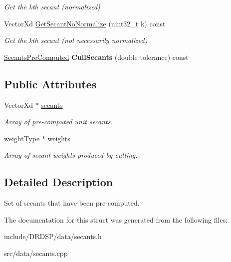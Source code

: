 \begin{DoxyCompactItemize}
\begin{DoxyCompactList}\small\item\em Get the kth secant (normalized) \end{DoxyCompactList}\item 
\hypertarget{struct_d_r_d_s_p_1_1_secants_pre_computed_aedd413333624ec2b3da2a70262b65481}{Vector\-Xd \hyperlink{struct_d_r_d_s_p_1_1_secants_pre_computed_aedd413333624ec2b3da2a70262b65481}{Get\-Secant\-No\-Normalize} (uint32\-\_\-t k) const }\label{struct_d_r_d_s_p_1_1_secants_pre_computed_aedd413333624ec2b3da2a70262b65481}

\begin{DoxyCompactList}\small\item\em Get the kth secant (not necessarily normalized) \end{DoxyCompactList}\item 
\hypertarget{struct_d_r_d_s_p_1_1_secants_pre_computed_a8dcdb9edcefeee50e17d6ab3b792f5e6}{\hyperlink{struct_d_r_d_s_p_1_1_secants_pre_computed}{Secants\-Pre\-Computed} {\bfseries Cull\-Secants} (double tolerance) const }\label{struct_d_r_d_s_p_1_1_secants_pre_computed_a8dcdb9edcefeee50e17d6ab3b792f5e6}

\end{DoxyCompactItemize}
\subsection*{Public Attributes}
\begin{DoxyCompactItemize}
\item 
\hypertarget{struct_d_r_d_s_p_1_1_secants_pre_computed_a15231ffddb89ae1eb2c83cbdc463905a}{Vector\-Xd $\ast$ \hyperlink{struct_d_r_d_s_p_1_1_secants_pre_computed_a15231ffddb89ae1eb2c83cbdc463905a}{secants}}\label{struct_d_r_d_s_p_1_1_secants_pre_computed_a15231ffddb89ae1eb2c83cbdc463905a}

\begin{DoxyCompactList}\small\item\em Array of pre-\/computed unit secants. \end{DoxyCompactList}\item 
\hypertarget{struct_d_r_d_s_p_1_1_secants_pre_computed_a4bb39354f325540fefe37eb7c3f59ad1}{weight\-Type $\ast$ \hyperlink{struct_d_r_d_s_p_1_1_secants_pre_computed_a4bb39354f325540fefe37eb7c3f59ad1}{weights}}\label{struct_d_r_d_s_p_1_1_secants_pre_computed_a4bb39354f325540fefe37eb7c3f59ad1}

\begin{DoxyCompactList}\small\item\em Array of secant weights produced by culling. \end{DoxyCompactList}\end{DoxyCompactItemize}


\subsection{Detailed Description}
Set of secants that have been pre-\/computed. 

The documentation for this struct was generated from the following files\-:\begin{DoxyCompactItemize}
\item 
include/\-D\-R\-D\-S\-P/data/secants.\-h\item 
src/data/secants.\-cpp\end{DoxyCompactItemize}
